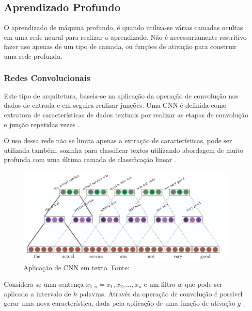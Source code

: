\subsection{Aprendizado Profundo}

O aprendizado de máquina profundo, é quando utiliza-se várias camadas ocultas em uma rede neural para realizar o aprendizado. Não é necessariamente restritivo fazer uso apenas de um tipo de camada, ou funções de ativação para construir uma rede profunda.

\subsubsection{Redes Convolucionais}

Este tipo de arquitetura, baseia-se na aplicação da operação de convolução nos dados de entrada e em seguira realizar junções. Uma CNN é definida como extratora de características de dados textuais por realizar as etapas de convolução e junção repetidas vezes \cite{GOLDBERG2017}. 

O uso dessa rede não se limita apenas a extração de características, pode ser utilizada também, sozinha para classificar textos utilizando abordagem de muito profunda com uma última camada de classificação linear \cite{CONNEAU2016}.

\begin{figure}[h]
	\centering
	\includegraphics[keepaspectratio=true,scale=0.5]{figuras/cnnText}
	\caption[Aplicação de CNN em texto]{Aplicação de CNN em texto. Fonte: \cite[Página 160]{GOLDBERG2017}}
	\label{fig:filterCnnText}
\end{figure}

Considera-se uma sentença $x_{1:n} = x_{1}, x_{2}, ..., x_{n}$ e um filtro $w$ que pode ser aplicado a intervalo de $h$ palavras. Através da operação de convolução é possível gerar uma nova característica, dada pela aplicação de uma função de ativação $g$ \cite{KIM2014}:

